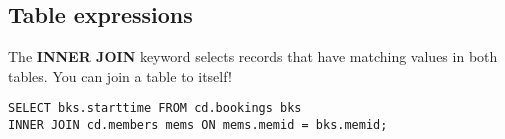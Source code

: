 %

\subsection{Table expressions}
The \textbf{INNER JOIN} keyword selects records that have matching values in both tables.
You can join a table to itself!
\begin{verbatim}
SELECT bks.starttime FROM cd.bookings bks
INNER JOIN cd.members mems ON mems.memid = bks.memid;
\end{verbatim}

%